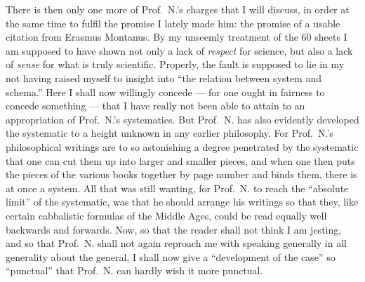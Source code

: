\documentclass[12pt,a4paper]{book}
\begin{document}
There is then only one more of Prof.\ N.'s charges that I will discuss, in order
at the same time to fulfil the promise I lately made him: the promise of a usable
citation from Erasmus Montanus. By my unseemly treatment of the 60 sheets I am
supposed to have shown not only a lack of \emph{respect} for science, but also a
lack of \emph{sense} for
what is truly scientific. Properly, the fault is supposed to lie in my not having
raised myself to insight into ``the relation between system and schema.'' Here I
shall now willingly concede --- for one ought in fairness to concede something
--- that I have really not been able to attain to an appropriation of Prof.\ N.'s
systematics. But Prof.\ N. has also evidently developed the systematic to a height
unknown in any earlier philosophy. For Prof.\ N.'s philosophical writings are to
so astonishing a degree penetrated by the systematic that one can cut them up
into larger and smaller pieces, and when one then puts the pieces of the various
books together by page number and binds them, there is at once a system. All that
was still wanting, for Prof.\ N. to reach the ``absolute limit'' of the
systematic, was that he should arrange his writings so that they, like certain
cabbalistic formulas of the Middle Ages, could be read equally well backwards
\setcounter{footnote}{0}
and forwards. Now, so that the reader shall not think I am jesting, and so that
Prof.\ N. shall not again reproach me with speaking generally in all generality
about the general, I shall now give a ``development of the case'' so ``punctual''
that Prof.\ N. can hardly wish it more punctual.
\end{document}
